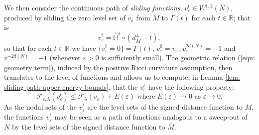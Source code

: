 \documentclass[11pt]{article}
\begin{document}
We then consider the continuous path of \textit{sliding functions}, $v^t_\varepsilon \in W^{1,2}(N)$, produced by sliding the zero level set of $v_\varepsilon$ from $\overline{M}$ to $\Gamma(t)$ for each $t \in \mathbb{R}$; that is
\begin{equation*}
    v^t_\varepsilon = \overline{\mathbb{H}}^\varepsilon \circ (d^\pm_{\overline{M}} - t),
\end{equation*}
so that for each $t \in \mathbb{R}$ we have $\{ v^t_\varepsilon = 0 \} = \Gamma(t)$, $v^0_\varepsilon = v_\varepsilon$, $v^{2d(N)}_\varepsilon = -1$ and $v^{-2d(N)} = +1$ (whenever $\varepsilon > 0$ is sufficiently small). The geometric relation (\ref{eqn: geometry term}), induced by the positive Ricci curvature assumption, then translates to the level of functions and allows us to compute, in Lemma \ref{lem: sliding path upper energy bounds}, that the $v^t_\varepsilon$ have the following property:
\begin{equation*}
    \mathcal{F}_{\varepsilon,\lambda}(v^t_\varepsilon) \leq  \mathcal{F}_\lambda(v_\varepsilon) + E(\varepsilon) \text{ where } E(\varepsilon) \rightarrow 0 \text{ as } \varepsilon \rightarrow 0.
\end{equation*}
As the nodal sets of the $v^t_\varepsilon$ are the level sets of the signed distance function to $\overline{M}$, the functions $v^t_\varepsilon$ may be seen as a path of functions analogous to a sweep-out of $N$ by the level sets of the signed distance function to $\overline{M}$. 

\bigskip
\end{document}
